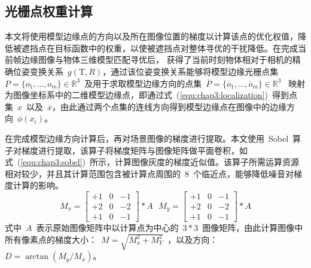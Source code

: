 \subsection{光栅点权重计算}
\label{sec:Direction weight Calculation}
本文将使用模型边缘点的方向以及所在图像位置的梯度以计算该点的优化权值，降低被遮挡点在目标函数中的权重，以使被遮挡点对整体寻优的干扰降低。在完成当前帧边缘图像与物体三维模型匹配寻优后，
获得了当前时刻物体相对于相机的精确位姿变换关系~$g(\textrm{T},R)$，通过该位姿变换关系能够将模型边缘光栅点集~$P=\{o_1,\dotsc ,o_m\}\in \mathbb{R}^3$~及用于求取模型边缘方向的点集~$\overline P=\{\overline o_1,\dotsc ,\overline o_m\}\in \mathbb{R}^3$~
映射为图像坐标系中的二维模型边缘点，即通过式~(\ref{equ:chap3:localization})~得到点集~$x$~以及~$\overline x$，由此通过两个点集的连线方向得到模型边缘点在图像中的边缘方向~$\phi(x_i)$。

在完成模型边缘方向计算后，再对场景图像的梯度进行提取。本文使用~Sobel~算子对梯度进行提取，该算子将梯度矩阵与图像矩阵做平面卷积，如式~(\ref{equ:chap3:sobel})~所示，计算图像灰度的梯度近似值。该算子所需运算资源
相对较少，并且其计算范围包含被计算点周围的~8~个临近点，能够降低噪音对梯度计算的影响。
\begin{equation}
  \label{equ:chap3:sobel}
    M_x=\left[
      \begin{matrix}
        +1&0&-1\\
        +2&0&-2\\
        +1&0&-1
      \end{matrix}\right]*A~~~
    M_y=\left[
      \begin{matrix}
        +1&0&-1\\
        +2&0&-2\\
        +1&0&-1
      \end{matrix}\right]*A
\end{equation}
式中~$A$~表示原始图像矩阵中以计算点为中心的~$3 * 3$~图像矩阵，由此计算图像中所有像素点的梯度大小：~$M=\sqrt{M_x^2+M_Y^2}$~，以及方向：~$D = \arctan (M_y / M_x)$。

